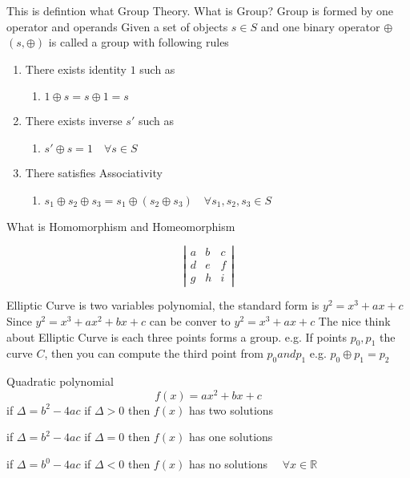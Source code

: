 \begin{defintion}
This is defintion what Group Theory.
What is Group?
Group is formed by one operator and operands
Given a set of objects $s \in S$ and one binary operator $\oplus$
$(s, \oplus)$ is called a group with following rules
\begin{enumerate}
\item There exists identity $1$ such as
    \begin{enumerate}
    \item $1 \oplus s = s \oplus 1 = s$ 
    \end{enumerate} 

\item There exists inverse $s'$ such as
    \begin{enumerate}
    \item $s' \oplus s = 1 \quad \forall s \in S$ 
    \end{enumerate} 

\item There satisfies Associativity 
    \begin{enumerate}
    \item  $s_1 \oplus s_2 \oplus s_3 = s_1 \oplus (s_2 \oplus s_3) \quad \forall s_1, s_2, s_3 \in S$ 
    \end{enumerate} 
\end{enumerate} 
\end{defintion}

\begin{defintion}
What is Homomorphism and Homeomorphism
\end{defintion}

\[
    \left| \begin{array}{ccc}
    a & b & c \\
    d & e & f \\
    g & h & i \end{array} \right|
\] 

\begin{theorem}
Elliptic Curve is two variables polynomial, the standard form is $y^2 = x^3 + ax + c$ 
Since $y^2 = x^3 + ax^2 + bx + c$ can be conver to $y^2 = x^3 + ax + c$
The nice think about Elliptic Curve is each three points forms a group.
e.g. If points $p_0, p_1$ the curve $C$, then you can compute the third point
from $p_0 and p_1$
e.g. $p_0 \oplus p_1 = p_2$
\end{theorem} 

\begin{theorem}
Quadratic polynomial \[ f(x) = ax^2 + bx + c  \]
if $\Delta = b^2 - 4ac$ if $\Delta > 0$ 
then $f(x)$ has two solutions

if $\Delta = b^2 - 4ac$ if $\Delta = 0$
then $f(x)$ has one solutions

if $\Delta = b^0 - 4ac$ if $\Delta < 0$
then $f(x)$ has no solutions $\quad \forall x \in \mathbb{R}$
\end{theorem} 

